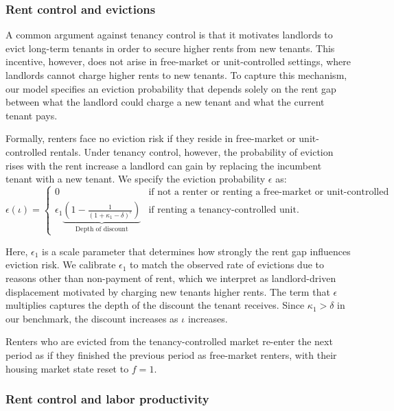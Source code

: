\documentclass[parskip=full]{article}
\begin{document}
\subsubsection{Rent control and evictions}

A common argument against tenancy control is that it motivates landlords to evict long-term tenants in order to secure higher rents from new tenants. This incentive, however, does not arise in free-market or unit-controlled settings, where landlords cannot charge higher rents to new tenants. To capture this mechanism, our model specifies an eviction probability that depends solely on the rent gap between what the landlord could charge a new tenant and what the current tenant pays.

Formally, renters face no eviction risk if they reside in free-market or unit-controlled rentals. Under tenancy control, however, the probability of eviction rises with the rent increase a landlord can gain by replacing the incumbent tenant with a new tenant. We specify the eviction probability $\epsilon$ as:
\begin{equation}\label{eq:eviction}
\epsilon(\iota)=
\begin{cases}
0 & \text{if not a renter or renting a free-market or unit-controlled unit} \\ \epsilon_1 \underbrace{\left(1-\frac{1}{\left(1 + \kappa_1 - \delta \right)^{\iota}}\right)}_{\text{Depth of discount}} & \text{if renting a tenancy-controlled unit}.
\end{cases}
\end{equation}

\noindent Here, $\epsilon_1$ is a scale parameter that determines how strongly the rent gap influences eviction risk. We calibrate $\epsilon_1$ to match the observed rate of evictions due to reasons other than non-payment of rent, which we interpret as landlord-driven displacement motivated by charging new tenants higher rents. The term that $\epsilon$ multiplies captures the depth of the discount the tenant receives. Since $\kappa_1>\delta$ in our benchmark, the discount increases as $\iota$ increases.

Renters who are evicted from the tenancy-controlled market re-enter the next period as if they finished the previous period as free-market renters, with their housing market state reset to $f=1$.

\subsubsection{Rent control and labor productivity}
\end{document}
